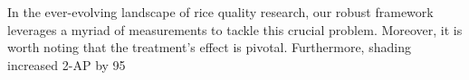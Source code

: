 In the ever-evolving landscape of rice quality research, our robust framework leverages a myriad of measurements to tackle this crucial problem. Moreover, it is worth noting that the treatment's effect is pivotal. Furthermore, shading increased 2-AP by 95%
